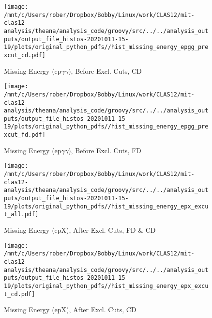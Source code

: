 \documentclass{article}
\begin{document}
\begin{landscape}
    \begin{figure}[h]
        \centering

        \texttt{[image: /mnt/c/Users/rober/Dropbox/Bobby/Linux/work/CLAS12/mit-clas12-analysis/theana/analysis\_code/groovy/src/../../analysis\_outputs/output\_file\_histos-20201011-15-19/plots/original\_python\_pdfs//hist\_missing\_energy\_epgg\_prexcut\_cd.pdf]}
        \captionsetup{textformat=empty,labelformat=blank}
        \caption{Missing Energy (ep$\gamma$$\gamma$), Before Excl. Cuts, CD}
    \end{figure}
    \clearpage
    
    \begin{figure}[h]
        \centering

        \texttt{[image: /mnt/c/Users/rober/Dropbox/Bobby/Linux/work/CLAS12/mit-clas12-analysis/theana/analysis\_code/groovy/src/../../analysis\_outputs/output\_file\_histos-20201011-15-19/plots/original\_python\_pdfs//hist\_missing\_energy\_epgg\_prexcut\_fd.pdf]}
        \captionsetup{textformat=empty,labelformat=blank}
        \caption{Missing Energy (ep$\gamma$$\gamma$), Before Excl. Cuts, FD}
    \end{figure}
    \clearpage
    
    \begin{figure}[h]
        \centering

        \texttt{[image: /mnt/c/Users/rober/Dropbox/Bobby/Linux/work/CLAS12/mit-clas12-analysis/theana/analysis\_code/groovy/src/../../analysis\_outputs/output\_file\_histos-20201011-15-19/plots/original\_python\_pdfs//hist\_missing\_energy\_epx\_excut\_all.pdf]}
        \captionsetup{textformat=empty,labelformat=blank}
        \caption{Missing Energy (epX), After Excl. Cuts, FD \& CD}
    \end{figure}
    \clearpage
    
    \begin{figure}[h]
        \centering

        \texttt{[image: /mnt/c/Users/rober/Dropbox/Bobby/Linux/work/CLAS12/mit-clas12-analysis/theana/analysis\_code/groovy/src/../../analysis\_outputs/output\_file\_histos-20201011-15-19/plots/original\_python\_pdfs//hist\_missing\_energy\_epx\_excut\_cd.pdf]}
        \captionsetup{textformat=empty,labelformat=blank}
        \caption{Missing Energy (epX), After Excl. Cuts, CD}
    \end{figure}
    \clearpage
    
    \begin{figure}[h]
        \centering


\end{figure}
\end{landscape}
\end{document}
